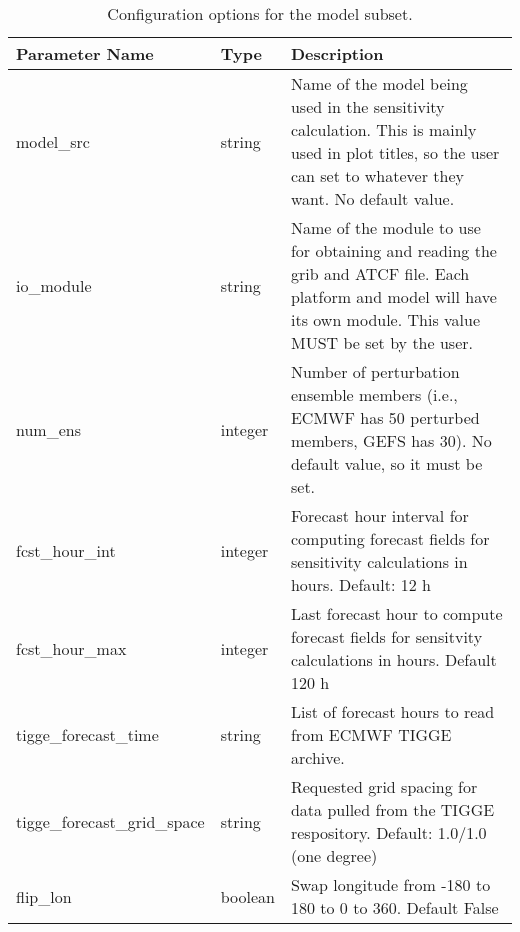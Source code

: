 \documentclass[psfig,12pt]{article}
\begin{document}
\begin{table}[H]
\caption{Configuration options for the model subset.}
\begin{center}
\begin{tabular}{|p{1.75in}|p{0.5in}|p{4.00in}|}
\hline
Parameter Name & Type & Description \\  \hline\hline
model\_src & string & Name of the model being used in the sensitivity calculation.  This is mainly used in
plot titles, so the user can set to whatever they want.  No default value.  \\  \hline
io\_module & string & Name of the module to use for obtaining and reading the grib and ATCF file.  Each
platform and model will have its own module.  This value MUST be set by the user. \\  \hline
num\_ens & integer & Number of perturbation ensemble members (i.e., ECMWF has 50 perturbed members, 
GEFS has 30).  No default value, so it must be set. \\  \hline
fcst\_hour\_int & integer & Forecast hour interval for computing forecast fields for sensitivity 
calculations in hours.  Default:  12 h \\  \hline
fcst\_hour\_max & integer & Last forecast hour to compute forecast fields for sensitvity 
calculations in hours.  Default 120 h \\  \hline
tigge\_forecast\_time & string & List of forecast hours to read from ECMWF TIGGE archive. \\ \hline
tigge\_forecast\_grid\_space & string & Requested grid spacing for data pulled from the 
TIGGE respository.  Default: 1.0/1.0 (one degree) \\ \hline
flip\_lon & boolean & Swap longitude from -180 to 180 to 0 to 360.  Default False \\ \hline
\end{tabular}
\end{center}
\end{table}
\end{document}
